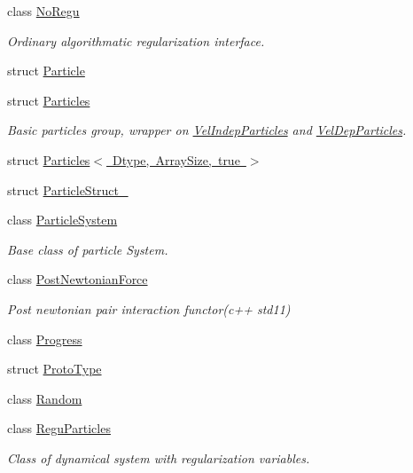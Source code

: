 \begin{DoxyCompactItemize}
\item 
class \mbox{\hyperlink{class_space_h_1_1_no_regu}{No\+Regu}}
\begin{DoxyCompactList}\small\item\em Ordinary algorithmatic regularization interface. \end{DoxyCompactList}\item 
struct \mbox{\hyperlink{struct_space_h_1_1_particle}{Particle}}
\item 
struct \mbox{\hyperlink{struct_space_h_1_1_particles}{Particles}}
\begin{DoxyCompactList}\small\item\em Basic particles group, wrapper on \mbox{\hyperlink{class_space_h_1_1_vel_indep_particles}{Vel\+Indep\+Particles}} and \mbox{\hyperlink{class_space_h_1_1_vel_dep_particles}{Vel\+Dep\+Particles}}. \end{DoxyCompactList}\item 
struct \mbox{\hyperlink{struct_space_h_1_1_particles_3_01_dtype_00_01_array_size_00_01true_01_4}{Particles$<$ Dtype, Array\+Size, true $>$}}
\item 
struct \mbox{\hyperlink{struct_space_h_1_1_particle_struct__}{Particle\+Struct\+\_\+}}
\item 
class \mbox{\hyperlink{class_space_h_1_1_particle_system}{Particle\+System}}
\begin{DoxyCompactList}\small\item\em Base class of particle System. \end{DoxyCompactList}\item 
class \mbox{\hyperlink{class_space_h_1_1_post_newtonian_force}{Post\+Newtonian\+Force}}
\begin{DoxyCompactList}\small\item\em Post newtonian pair interaction functor(c++ std11) \end{DoxyCompactList}\item 
class \mbox{\hyperlink{class_space_h_1_1_progress}{Progress}}
\item 
struct \mbox{\hyperlink{struct_space_h_1_1_proto_type}{Proto\+Type}}
\item 
class \mbox{\hyperlink{class_space_h_1_1_random}{Random}}
\item 
class \mbox{\hyperlink{class_space_h_1_1_regu_particles}{Regu\+Particles}}
\begin{DoxyCompactList}\small\item\em Class of dynamical system with regularization variables. \end{DoxyCompactList}\item 

\end{DoxyCompactItemize}
